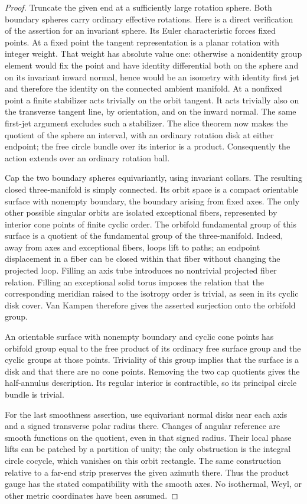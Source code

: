 \begin{proof}
Truncate the given end at a sufficiently large rotation sphere.  Both
boundary spheres carry ordinary effective rotations.  Here is a direct
verification of the assertion for an invariant sphere.  Its Euler
characteristic forces fixed points.  At a fixed point the tangent
representation is a planar rotation with integer weight.  That weight
has absolute value one: otherwise a nonidentity group element would
fix the point and have identity differential both on the sphere and on
its invariant inward normal, hence would be an isometry with identity
first jet and therefore the identity on the connected ambient
manifold.  At a nonfixed point a finite stabilizer acts trivially on the
orbit tangent.  It acts trivially also on the transverse tangent line,
by orientation, and on the inward normal.  The same first-jet argument
excludes such a stabilizer.  The slice theorem now makes the quotient
of the sphere an interval, with an ordinary rotation disk at either
endpoint; the free circle bundle over its interior is a product.
Consequently the action extends over an ordinary rotation ball.

Cap the two boundary spheres equivariantly, using invariant collars.
The resulting closed three-manifold is simply connected.  Its orbit
space is a compact orientable surface with nonempty boundary, the
boundary arising from fixed axes.  The only other possible singular
orbits are isolated exceptional fibers, represented by interior cone
points of finite cyclic order.  The orbifold fundamental group of this
surface is a quotient of the fundamental group of the three-manifold.
Indeed, away from axes and exceptional fibers, loops lift to paths;
an endpoint displacement in a fiber can be closed within that fiber
without changing the projected loop.  Filling an axis tube introduces
no nontrivial projected fiber relation.  Filling an exceptional solid
torus imposes the relation that the corresponding meridian raised to
the isotropy order is trivial, as seen in its cyclic disk cover.
Van Kampen therefore gives the asserted surjection onto the orbifold
group.

An orientable surface with nonempty boundary and cyclic cone points
has orbifold group equal to the free product of its ordinary free
surface group and the cyclic groups at those points.  Triviality of
this group implies that the surface is a disk and that there are no
cone points.  Removing the two cap quotients gives the half-annulus
description.  Its regular interior is contractible, so its principal
circle bundle is trivial.

For the last smoothness assertion, use equivariant normal disks near
each axis and a signed transverse polar radius there.  Changes of
angular reference are smooth functions on the quotient, even in that
signed radius.  Their local phase lifts can be patched by a partition
of unity; the only obstruction is the integral circle cocycle, which
vanishes on this orbit rectangle.  The same construction relative to
a far-end strip preserves the given azimuth there.  Thus the product
gauge has the stated compatibility with the smooth axes.  No
isothermal, Weyl, or other metric coordinates have been assumed.
\end{proof}

